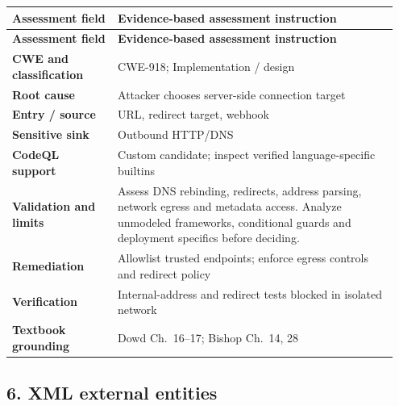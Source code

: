 \documentclass[11pt,letterpaper,oneside]{book}
\begin{document}
\small
\setlength{\tabcolsep}{2pt}
\renewcommand{\arraystretch}{1.18}
\begin{longtable}{>{\raggedright\arraybackslash}p{0.26\linewidth}>{\raggedright\arraybackslash}p{0.69\linewidth}}
\toprule
\textbf{Assessment field} & \textbf{Evidence-based assessment instruction}\\
\midrule
\endfirsthead
\toprule
\textbf{Assessment field} & \textbf{Evidence-based assessment instruction}\\
\midrule
\endhead
\textbf{CWE and classification} & CWE-918; Implementation / design\\
\textbf{Root cause} & Attacker chooses server-side connection target\\
\textbf{Entry / source} & URL, redirect target, webhook\\
\textbf{Sensitive sink} & Outbound HTTP/DNS\\
\textbf{CodeQL support} & Custom candidate; inspect verified language-specific builtins\\
\textbf{Validation and limits} & Assess DNS rebinding, redirects, address parsing, network egress and metadata access. Analyze unmodeled frameworks, conditional guards and deployment specifics before deciding.\\
\textbf{Remediation} & Allowlist trusted endpoints; enforce egress controls and redirect policy\\
\textbf{Verification} & Internal-address and redirect tests blocked in isolated network\\
\textbf{Textbook grounding} & Dowd Ch.~16--17; Bishop Ch.~14, 28\\
\bottomrule
\end{longtable}
\normalsize

\subsection{6. XML external entities}
\end{document}
